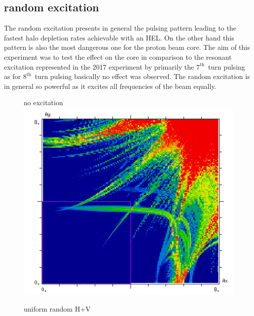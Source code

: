 \documentclass[%
 reprint,
 amsmath,amssymb,
 aps,
prstab,
longbibliography
]{revtex4-1}
\begin{document}
\subsection{random excitation\label{sec:simexran}}
The random excitation presents in general the pulsing pattern leading to the fastest halo depletion rates achievable with an HEL. On the other hand this pattern is also the most dangerous one for the proton beam core. The aim of this experiment was to test the effect on the core in comparison to the resonant excitation represented in the 2017 experiment by primarily the $7^{\mathrm{th}}$~turn pulsing as for $8^{\mathrm{th}}$~turn pulsing basically no effect was observed. The random excitation is in general so powerful as it excites all frequencies of the beam equally.
\begin{figure}[h]
	\begin{minipage}[t]{0.49\linewidth}
		\centering
		no excitation
		\includegraphics[width=1.0\linewidth]{2017injnocolc15o+19_6noerru_dp0_amp.png}
	\end{minipage}
	\begin{minipage}[t]{0.49\linewidth}
		\centering
		uniform random H+V

\end{minipage}
\end{figure}
\end{document}
